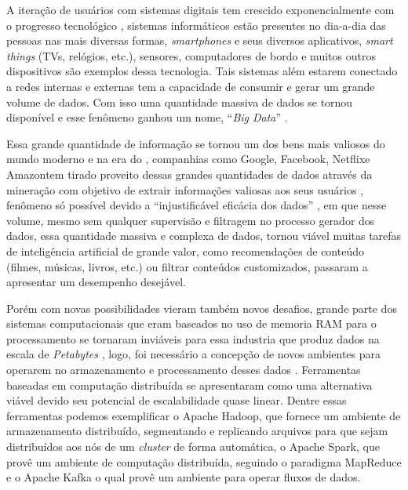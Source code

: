 \newcommand{\registered}{\textsuperscript{\tiny\textregistered}}

A iteração de usuários com sistemas digitais tem crescido exponencialmente com
o progresso tecnológico \cite{dean2008mapreduce,atzori2010internet}, sistemas
informáticos estão presentes no dia-a-dia das pessoas nas mais diversas formas,
\textit{smartphones} e seus diversos aplicativos, \textit{smart things} (TVs,
relógios, etc.), sensores, computadores de bordo e muitos outros dispositivos
são exemplos dessa tecnologia. Tais sistemas além estarem conectado a redes
internas e externas tem a capacidade de consumir e gerar um grande volume de
dados. Com isso uma quantidade massiva de dados se tornou disponível e esse
fenômeno ganhou um nome, ``\textit{Big Data}'' \cite{mcafee2012big}.

Essa grande quantidade de informação se tornou um dos bens mais valiosos do
mundo moderno \cite{economist2017world} e na era do ,
companhias como Google\registered, Facebook\registered, Netflix\registered e
Amazon\registered tem tirado proveito dessas grandes quantidades de dados
através da mineração com objetivo de extrair informações valiosas aos seus
usuários \cite{tarnoff2018big, finger2014data}, fenômeno só possível devido a
``injustificável eficácia dos dados'' \cite{halevy2009unreasonable}, em que
nesse volume, mesmo sem qualquer supervisão e filtragem no processo gerador dos
dados, essa quantidade massiva e complexa de dados, tornou viável muitas
tarefas de inteligência artificial de grande valor, como recomendações de
conteúdo (filmes, músicas, livros, etc.) ou filtrar conteúdos customizados,
passaram a apresentar um desempenho desejável.

Porém com novas possibilidades vieram também novos desafios, grande parte dos
sistemas computacionais que eram baseados no uso de memoria RAM para o
processamento se tornaram inviáveis para essa industria que produz dados na
escala de \textit{Petabytes} \cite{dean2008mapreduce}, logo, foi necessário a
concepção de novos ambientes para operarem no armazenamento e processamento
desses dados \cite{gama2007learning}. Ferramentas baseadas em computação
distribuída se apresentaram como uma alternativa viável devido seu potencial de
escalabilidade quase linear. Dentre essas ferramentas podemos exemplificar o
Apache Hadoop\textsuperscript{\tiny\textregistered}, que fornece um ambiente de
armazenamento distribuído, segmentando e replicando arquivos para que sejam
distribuídos aos nós de um \textit{cluster} de forma automática, o Apache
Spark\textsuperscript{\tiny\textregistered}, que provê um ambiente de
computação distribuída, seguindo o paradigma MapReduce e o Apache
Kafka\textsuperscript{\tiny\textregistered} o qual provê um ambiente para
operar fluxos de dados.

